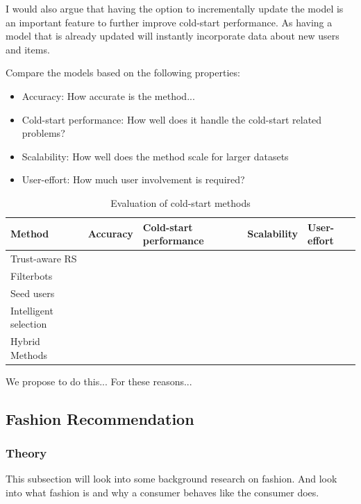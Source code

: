 I would also argue that having the option to incrementally update the model is
an important feature to further improve cold-start performance. As having a
model that is already updated will instantly incorporate data about new users
and items.

Compare the models based on the following properties:

\begin{itemize}
	\item Accuracy: How accurate is the method...
	\item Cold-start performance: How well does it handle the cold-start related problems?
	\item Scalability: How well does the method scale for larger datasets
	\item User-effort: How much user involvement is required?
\end{itemize}

\begin{table}[H]
    \centering
    \begin{tabular}{|l|l|l|l|l|}
    \hline
	Method & Accuracy & Cold-start performance & Scalability & User-effort \\ \hline
	Trust-aware RS & & & \\ \hline
	Filterbots & & & \\ \hline
	Seed users & & & \\ \hline
	Intelligent selection & & & \\ \hline
	Hybrid Methods & & & \\ \hline
    \end{tabular}
    \caption[Evaluation of cold-start methods]{Evaluation of cold-start methods}
    \label{table:evaluationcoldstart}
\end{table}

We propose to do this...
For these reasons...

\subsection{Fashion Recommendation}


\subsubsection{Theory}
This subsection will look into some background research on fashion.  And look
into what fashion is and why a consumer behaves like the consumer does.

